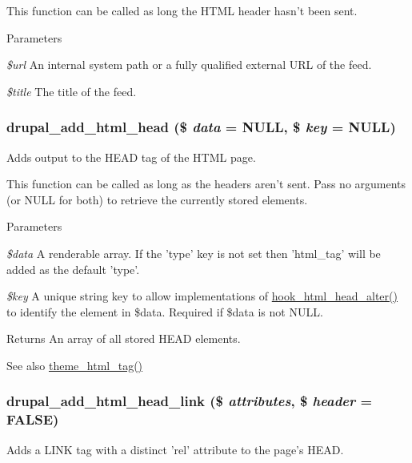 This function can be called as long the HTML header hasn't been sent.


\begin{DoxyParams}{Parameters}
\item[{\em \$url}]An internal system path or a fully qualified external URL of the feed. \item[{\em \$title}]The title of the feed. \end{DoxyParams}
\hypertarget{common_8inc_a39eab16a83904b845fccc922a0c5c2cf}{
\subsubsection[{drupal\_\-add\_\-html\_\-head}]{\setlength{\rightskip}{0pt plus 5cm}drupal\_\-add\_\-html\_\-head (\$ {\em data} = {\ttfamily NULL}, \/  \$ {\em key} = {\ttfamily NULL})}}
\label{common_8inc_a39eab16a83904b845fccc922a0c5c2cf}
Adds output to the HEAD tag of the HTML page.

This function can be called as long as the headers aren't sent. Pass no arguments (or NULL for both) to retrieve the currently stored elements.


\begin{DoxyParams}{Parameters}
\item[{\em \$data}]A renderable array. If the 'type' key is not set then 'html\_\-tag' will be added as the default 'type'. \item[{\em \$key}]A unique string key to allow implementations of \hyperlink{group__hooks_ga0769a87ac64497be6b87aea2b640839c}{hook\_\-html\_\-head\_\-alter()} to identify the element in \$data. Required if \$data is not NULL.\end{DoxyParams}
\begin{DoxyReturn}{Returns}
An array of all stored HEAD elements.
\end{DoxyReturn}
\begin{DoxySeeAlso}{See also}
\hyperlink{group__themeable_ga553aba4a879c7a0b01a85486ca0cea33}{theme\_\-html\_\-tag()} 
\end{DoxySeeAlso}
\hypertarget{common_8inc_aad501b017775a67b155fe5e441f1ad9d}{
\subsubsection[{drupal\_\-add\_\-html\_\-head\_\-link}]{\setlength{\rightskip}{0pt plus 5cm}drupal\_\-add\_\-html\_\-head\_\-link (\$ {\em attributes}, \/  \$ {\em header} = {\ttfamily FALSE})}}
\label{common_8inc_aad501b017775a67b155fe5e441f1ad9d}
Adds a LINK tag with a distinct 'rel' attribute to the page's HEAD.

